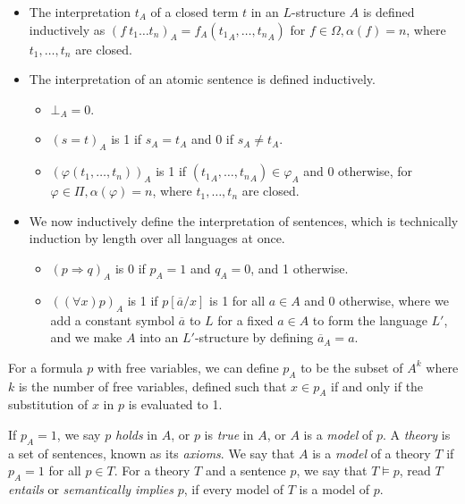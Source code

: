 \begin{itemize}
    \item The interpretation \( t_A \) of a closed term \( t \) in an \( L \)-structure \( A \) is defined inductively as \( (f\ t_1\dots t_n)_A = f_A({t_1}_A, \dots, {t_n}_A) \) for \( f \in \Omega, \alpha(f) = n \), where \( t_1, \dots, t_n \) are closed.
    \item The interpretation of an atomic sentence is defined inductively.
    \begin{itemize}
            \item \( \bot_A = 0 \).
        \item \( (s = t)_A \) is 1 if \( s_A = t_A \) and 0 if \( s_A \neq t_A \).
        \item \( (\varphi(t_1, \dots, t_n))_A \) is 1 if \( ({t_1}_A, \dots, {t_n}_A) \in \varphi_A \) and 0 otherwise, for \( \varphi \in \Pi, \alpha(\varphi) = n \), where \( t_1, \dots, t_n \) are closed.
    \end{itemize}
    \item We now inductively define the interpretation of sentences, which is technically induction by length over all languages at once.
    \begin{itemize}
        \item \( (p \Rightarrow q)_A \) is 0 if \( p_A = 1 \) and \( q_A = 0 \), and 1 otherwise.
        \item \( ((\forall x)p)_A \) is 1 if \( p[\overline a/x] \) is 1 for all \( a \in A \) and 0 otherwise, where we add a constant symbol \( \overline a \) to \( L \) for a fixed \( a \in A \) to form the language \( L' \), and we make \( A \) into an \( L' \)-structure by defining \( \overline a_A = a \).
    \end{itemize}
\end{itemize}
\begin{remark}
    For a formula \( p \) with free variables, we can define \( p_A \) to be the subset of \( A^k \) where \( k \) is the number of free variables, defined such that \( x \in p_A \) if and only if the substitution of \( x \) in \( p \) is evaluated to 1.
\end{remark}
\begin{definition}
    If \( p_A = 1 \), we say \( p \) \emph{holds} in \( A \), or \( p \) is \emph{true} in \( A \), or \( A \) is a \emph{model} of \( p \).
    A \emph{theory} is a set of sentences, known as its \emph{axioms}.
    We say that \( A \) is a \emph{model} of a theory \( T \) if \( p_A = 1 \) for all \( p \in T \).
    For a theory \( T \) and a sentence \( p \), we say that \( T \models p \), read \( T \) \emph{entails} or \emph{semantically implies} \( p \), if every model of \( T \) is a model of \( p \).
\end{definition}
